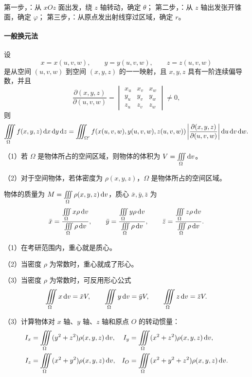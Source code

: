 \begin{notebox}[球面坐标系下定限：转、张、穿]
第一步，：从 $xOz$ 面出发，绕 $z$ 轴转动，确定 $\theta$；
第二步，：从 $z$ 轴出发张开锥面，确定 $\varphi$；
第三步，：从原点发出射线穿过区域，确定 $r$。
\end{notebox}

\paragraph{一般换元法}

设
\[
x=x(u,v,w),\qquad y=y(u,v,w),\qquad z=z(u,v,w)
\]
是从空间 $(u,v,w)$ 到空间 $(x,y,z)$ 的一一映射，且 $x,y,z$ 具有一阶连续偏导数，并且
\[
\frac{\partial(x,y,z)}{\partial(u,v,w)}
=\begin{vmatrix}
x_u&x_v&x_w\\
y_u&y_v&y_w\\
z_u&z_v&z_w
\end{vmatrix}\ne0,
\]
则
\[
\iiint\limits_{\Omega} f(x,y,z)\mathop{}\!\mathrm d x\mathop{}\!\mathrm d y\mathop{}\!\mathrm d z
=\iiint_{\Omega'}f(x(u,v,w),y(u,v,w),z(u,v,w))
\left|\frac{\partial(x,y,z)}{\partial(u,v,w)}\right|
\mathop{}\!\mathrm d u\mathop{}\!\mathrm d v\mathop{}\!\mathrm d w.
\]


（1）若 $\Omega$ 是物体所占的空间区域，则物体的体积为 $V=\iiint\limits_{\Omega}\mathop{}\!\mathrm d v$。

（2）对于空间物体，若体密度为 $\rho(x,y,z)$，$\Omega$ 是物体所占的空间区域。

\noindent 物体的质量为 $M=\iiint\limits_{\Omega}\rho(x,y,z)\mathop{}\!\mathrm d v$，质心 $\bar x,\bar y,\bar z$ 为
\[
\bar x=\frac{\iiint\limits_{\Omega} x\rho\mathop{}\!\mathrm d v}{\iiint\limits_{\Omega}\rho\mathop{}\!\mathrm d v},\qquad
\bar y=\frac{\iiint\limits_{\Omega} y\rho\mathop{}\!\mathrm d v}{\iiint\limits_{\Omega}\rho\mathop{}\!\mathrm d v},\qquad
\bar z=\frac{\iiint\limits_{\Omega} z\rho\mathop{}\!\mathrm d v}{\iiint\limits_{\Omega}\rho\mathop{}\!\mathrm d v}.
\]

\begin{notebox}
（1）在考研范围内，重心就是质心。

（2）当密度 $\rho$ 为常数时，重心就成了形心。

（3）当密度 $\rho$ 为常数时，可反用形心公式
\[
\iiint\limits_{\Omega} x\mathop{}\!\mathrm d v=\bar xV,\qquad
\iiint\limits_{\Omega} y\mathop{}\!\mathrm d v=\bar yV,\qquad
\iiint\limits_{\Omega} z\mathop{}\!\mathrm d v=\bar zV.
\]
\end{notebox}

（3）计算物体对 $x$ 轴、$y$ 轴、$z$ 轴和原点 $O$ 的转动惯量：
\begin{align*}
I_x&=\iiint\limits_{\Omega}(y^2+z^2)\rho(x,y,z)\mathop{}\!\mathrm d v,&
I_y&=\iiint\limits_{\Omega}(x^2+z^2)\rho(x,y,z)\mathop{}\!\mathrm d v,\\
I_z&=\iiint\limits_{\Omega}(x^2+y^2)\rho(x,y,z)\mathop{}\!\mathrm d v,&
I_O&=\iiint\limits_{\Omega}(x^2+y^2+z^2)\rho(x,y,z)\mathop{}\!\mathrm d v.
\end{align*}


